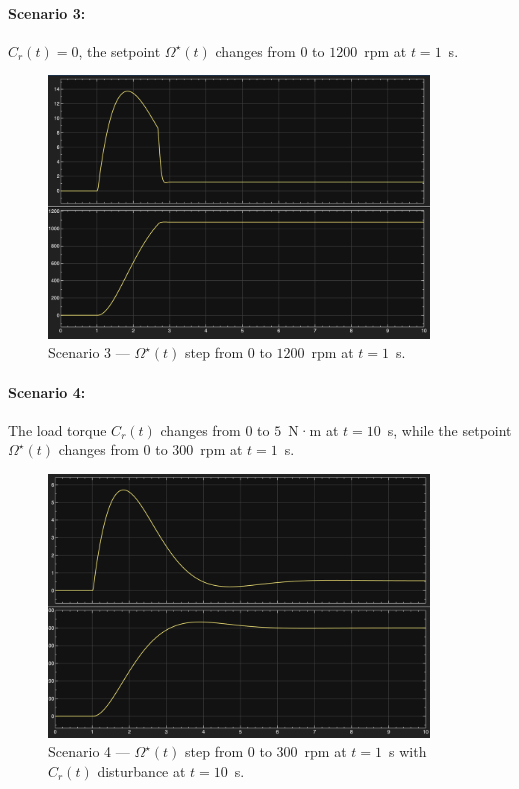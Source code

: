 \documentclass{rapportCS}
\begin{document}
\paragraph{Scenario 3:} $C_r(t)=0$, the setpoint $\Omega^\star(t)$ changes from $0$ to $1200$~rpm at $t=1$~s.
\begin{figure}[H]
\centering
\includegraphics[width=0.9\textwidth]{figures/simulink5.png}
\caption{Scenario 3 — $\Omega^\star(t)$ step from $0$ to $1200$~rpm at $t=1$~s.}
\label{fig:simulink5}
\end{figure}

\paragraph{Scenario 4:} The load torque $C_r(t)$ changes from $0$ to $5$~N·m at $t=10$~s, while the setpoint $\Omega^\star(t)$ changes from $0$ to $300$~rpm at $t=1$~s.
\begin{figure}[H]
\centering
\includegraphics[width=0.9\textwidth]{figures/simulink6.png}
\caption{Scenario 4 — $\Omega^\star(t)$ step from $0$ to $300$~rpm at $t=1$~s with $C_r(t)$ disturbance at $t=10$~s.}
\label{fig:simulink6}
\end{figure}
\end{document}
